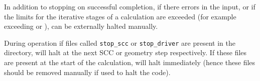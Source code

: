 In addition to stopping on successful completion, if there errors in the input,
or if the limits for the iterative stages of a calculation are exceeded (for
example exceeding  or ), \dftbp{} can be
externally halted manually.

During operation if files called \texttt{stop\_scc} or
\texttt{stop\_driver} are present in the directory, \dftbp{}
will halt at the next SCC or geometry step respectively. If these files are
present at the start of the calculation, \dftbp{} will halt immediately (hence
these files should be removed manually if used to halt the code).


